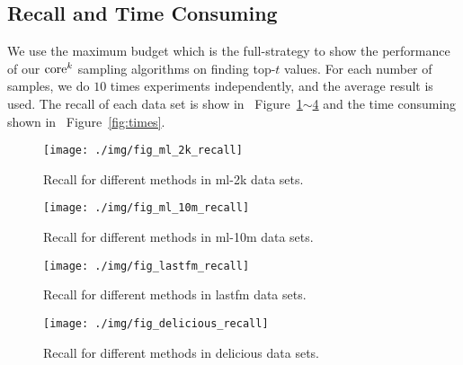\documentclass[letterpaper]{article}
\newcommand{\Fig}[1]   {Figure~\ref{fig:#1}}
\newcommand{\Figs}[2]  {Figure~\ref{fig:#1}$\sim$\ref{fig:#2}}
\begin{document}
\subsection{Recall and Time Consuming}
We use the maximum budget which is the full-strategy
to show the performance of our ${\rm core}^k$ sampling algorithms on finding top-$t$ values.
For each number of samples, we do $10$ times experiments independently,
and the average result is used.
The recall of each data set is show in ~\Figs{ml_2k_recall}{delicious_recall}
and the time consuming shown in ~\Fig{times}.
\begin{figure}[H]
  \centering
  \texttt{[image: ./img/fig\_ml\_2k\_recall]}\\
  \caption{Recall for different methods in ml-2k data sets.}
  \label{fig:ml_2k_recall}
\end{figure}
\begin{figure}[H]
  \centering
  \texttt{[image: ./img/fig\_ml\_10m\_recall]}\\
  \caption{Recall for different methods in ml-10m data sets.}
  \label{fig:ml_10m_recall}
\end{figure}
\begin{figure}[H]
  \centering
  \texttt{[image: ./img/fig\_lastfm\_recall]}\\
  \caption{Recall for different methods in lastfm data sets.}
  \label{fig:lastfm_recall}
\end{figure}
\begin{figure}[H]
  \centering
  \texttt{[image: ./img/fig\_delicious\_recall]}\\
  \caption{Recall for different methods in delicious data sets.}
  \label{fig:delicious_recall}
\end{figure}
\end{document}
